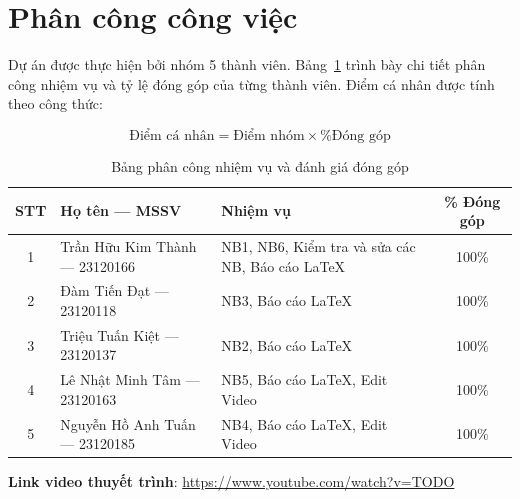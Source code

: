 \section{Phân công công việc}
\label{sec:planning}

Dự án được thực hiện bởi nhóm 5 thành viên. Bảng~\ref{tab:task_distribution} trình bày chi tiết phân công nhiệm vụ và tỷ lệ đóng góp của từng thành viên. Điểm cá nhân được tính theo công thức:

\begin{equation}
\text{Điểm cá nhân} = \text{Điểm nhóm} \times \text{\% Đóng góp}
\label{eq:individual_score}
\end{equation}

\begin{table}[H]
\centering
\caption{Bảng phân công nhiệm vụ và đánh giá đóng góp}
\label{tab:task_distribution}
\begin{tabular}{clp{7cm}c}
\toprule
\textbf{STT} & \textbf{Họ tên — MSSV} & \textbf{Nhiệm vụ} & \textbf{\% Đóng góp} \\
\midrule
1 & Trần Hữu Kim Thành — 23120166 & NB1, NB6, Kiểm tra và sửa các NB, Báo cáo LaTeX & 100\% \\
2 & Đàm Tiến Đạt — 23120118 & NB3, Báo cáo LaTeX & 100\% \\
3 & Triệu Tuấn Kiệt — 23120137 & NB2, Báo cáo LaTeX & 100\% \\
4 & Lê Nhật Minh Tâm — 23120163 & NB5, Báo cáo LaTeX, Edit Video & 100\% \\
5 & Nguyễn Hồ Anh Tuấn — 23120185 & NB4, Báo cáo LaTeX, Edit Video & 100\% \\
\bottomrule
\end{tabular}
\end{table}

\textbf{Link video thuyết trình}: \url{https://www.youtube.com/watch?v=TODO}
